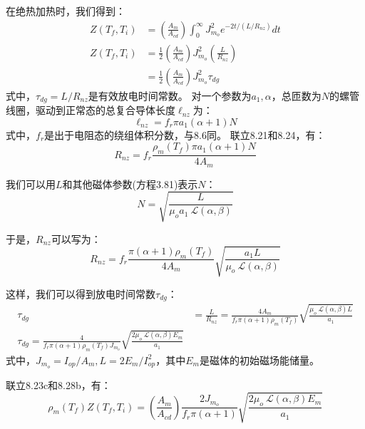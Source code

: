 在绝热加热时，我们得到：
\begin{subequations}%
	\begin{align}
Z(T_f,T_i)&=\left(\frac{A_m}{A_{cd}}\right)\int_{0}^{\infty}J_{m_o}^{2}e^{-2t/(L/R_{nz})}dt\\
Z(T_f,T_i)&=\frac{1}{2}\left(\frac{A_m}{A_{cd}}\right)J_{m_o}^{2}\left(\frac{L}{R_{nz}}\right) \\
&=\frac{1}{2}\left(\frac{A_m}{A_{cd}}\right)J_{m_o}^{2}\tau_{dg}
\end{align}
\end{subequations}
式中，$\tau_{dg}=L/R_{nz}$是有效放电时间常数。
对一个参数为$a_1,\alpha$，总匝数为$N$的螺管线圈，驱动到正常态的总复合导体长度$\ell_{nz}$为：
\begin{equation}%
\ell_{nz}=f_r\pi a_1(\alpha+1)N
\end{equation}
式中，$f_r$是出于电阻态的绕组体积分数，与8.6同。
联立8.21和8.24，有：
\begin{equation}%
R_{nz}=f_r\frac{\rho_m(T_f)\pi a_1(\alpha+1)N}{4A_m}
\end{equation}

我们可以用$L$和其他磁体参数(方程3.81)表示$N$：
\begin{equation}%
N=\sqrt{\frac{L}{\mu_oa_1\ \mathcal{L}(\alpha,\beta)}}
\end{equation}

于是，$R_{nz}$可以写为：
\begin{equation}%
R_{nz}=f_r\frac{\pi(\alpha+1)\rho_m(T_f)}{4A_m}\sqrt{\frac{a_1L}{\mu_o\ \mathcal{L}(\alpha,\beta)}}
\end{equation}

这样，我们可以得到放电时间常数$\tau_{dg}$：
\begin{subequations}%
	\begin{align}
\tau_{dg}&=\frac{L}{R_{nz}}=\frac{4A_m}{f_r\pi(\alpha+1)\rho_m(T_f)}\sqrt{\frac{\mu_o\ \mathcal{L}(\alpha,\beta)L}{a_1}}\\
\tau_{dg}=\frac{4}{f_r\pi(\alpha+1)\rho_m(T_f)J_{m_o}}\sqrt{\frac{2\mu_o\ \mathcal{L}(\alpha,\beta)E_m}{a_1}}
\end{align}
\end{subequations}
式中，$J_{m_o}=I_{op}/A_m, L=2E_m/I_{op}^2$，其中$E_m$是磁体的初始磁场能储量。

联立8.23c和8.28b，有：
\begin{equation}%
\rho_m(T_f)Z(T_f,T_i)=\left(\frac{A_m}{A_{cd}}\right)\frac{2J_{m_o}}{f_r\pi(\alpha+1)}\sqrt{\frac{2\mu_o\ \mathcal{L}(\alpha,\beta)E_m}{a_1}}
\end{equation}

